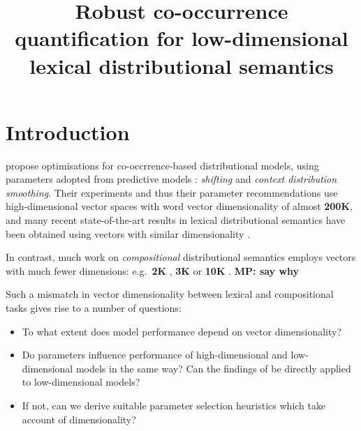 \documentclass[11pt]{article}
\title{Robust co-occurrence quantification for low-dimensional lexical distributional semantics}
\date{}
\begin{document}
\def\emnlp/{\textit{KS2013}}
\def\PhraseRel/{PhraseRel}

\def\PMI/{$1 \operatorname{PMI}$}
\def\SPMI/{$1 \operatorname{SPMI}$}
\def\CPMI/{$1 \operatorname{CPMI}$}
\def\SCPMI/{$1 \operatorname{SCPMI}$}

\def\NPMI/{$n \operatorname{PMI}$}
\def\NSPMI/{$n \operatorname{SPMI}$}
\def\NCPMI/{$n \operatorname{CPMI}$}
\def\NSCPMI/{$n \operatorname{SCPMI}$}

\def\logNPMI/{$\log n\operatorname{PMI}$}
\def\logNSPMI/{$\log n\operatorname{SPMI}$}
\def\logNCPMI/{$\log n \operatorname{CPMI}$}
\def\logNSCPMI/{$\log n \operatorname{SCPMI}$}

\maketitle
\begin{abstract}

\end{abstract}

\section{Introduction}
\label{sec:introduction}

 propose optimisations for co-occrrence-based distributional models, using parameters adopted from predictive models \cite{mikolov2013efficient}: \emph{shifting} and \emph{context distribution smoothing}. Their experiments and thus their parameter  recommendations use high-dimensional vector spaces with word vector dimensionality of almost \textbf{200K}, and many recent state-of-the-art results in lexical distributional semantics have been obtained using vectors with similar dimensionality  \cite{baroni-dinu-kruszewski:2014:P14-1,kiela-clark:2014:CVSC,lapesa2014large}.

In contrast, much work on \emph{compositional} distributional semantics employs vectors with much fewer dimensions: e.g.~\textbf{2K} \cite{Grefenstette:2011:ESC:2145432.2145580,kartsadrqpl2014,milajevs-EtAl:2014:EMNLP2014}, \textbf{3K} \cite{Dinu:2010:MDS:1870658.1870771,milajevs-purver:2014:CVSC} or \textbf{10K} \cite{polajnar-clark:2014:EACL,Baroni2010nouns}. \textbf{MP: say why}

Such a mismatch in vector dimensionality between lexical and compositional tasks gives rise to a number of questions:
\begin{itemize}
\item To what extent does model performance depend on vector dimensionality?
\item Do parameters influence performance of high-dimensional and low-dimensional models in the same way? Can the findings of  be directly applied to low-dimensional models?
\item If not, can we derive suitable parameter selection heuristics which take account of dimensionality?
\end{itemize}
\end{document}
